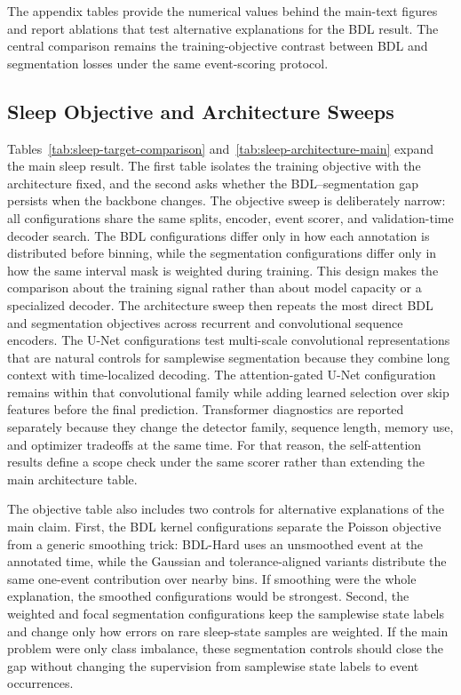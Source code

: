 The appendix tables provide the numerical values behind the main-text figures and report ablations that test alternative explanations for the BDL result.
The central comparison remains the training-objective contrast between BDL and segmentation losses under the same event-scoring protocol.

\subsection{Sleep Objective and Architecture Sweeps}

Tables~\ref{tab:sleep-target-comparison} and~\ref{tab:sleep-architecture-main} expand the main sleep result.
The first table isolates the training objective with the architecture fixed, and the second asks whether the BDL--segmentation gap persists when the backbone changes.
The objective sweep is deliberately narrow: all configurations share the same splits, encoder, event scorer, and validation-time decoder search.
The BDL configurations differ only in how each annotation is distributed before binning, while the segmentation configurations differ only in how the same interval mask is weighted during training.
This design makes the comparison about the training signal rather than about model capacity or a specialized decoder.
The architecture sweep then repeats the most direct BDL and segmentation objectives across recurrent and convolutional sequence encoders.
The U-Net configurations test multi-scale convolutional representations that are natural controls for samplewise segmentation because they combine long context with time-localized decoding.
The attention-gated U-Net configuration remains within that convolutional family while adding learned selection over skip features before the final prediction.
Transformer diagnostics are reported separately because they change the detector family, sequence length, memory use, and optimizer tradeoffs at the same time.
For that reason, the self-attention results define a scope check under the same scorer rather than extending the main architecture table.

The objective table also includes two controls for alternative explanations of the main claim.
First, the BDL kernel configurations separate the Poisson objective from a generic smoothing trick: BDL-Hard uses an unsmoothed event at the annotated time, while the Gaussian and tolerance-aligned variants distribute the same one-event contribution over nearby bins.
If smoothing were the whole explanation, the smoothed configurations would be strongest.
Second, the weighted and focal segmentation configurations keep the samplewise state labels and change only how errors on rare sleep-state samples are weighted.
If the main problem were only class imbalance, these segmentation controls should close the gap without changing the supervision from samplewise state labels to event occurrences.

